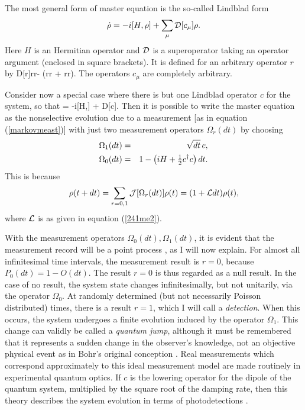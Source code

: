 \documentclass[12pt]{article}
\begin{document}
The most general form of master equation is the so-called Lindblad form
\cite{Lin76,Gar91}
\begin{equation} \label{241me1} 
\dot{\rho} = -{i}[H,\rho] + \sum_\mu  {\cal D}[c_\mu] \rho.
\end{equation}
Here $H$ is an Hermitian operator and ${\cal D}$ is a 
superoperator taking an operator argument (enclosed in square brackets). It is 
defined for an arbitrary operator $r$ by
\beq \label{defcalD}
{\cal D}[r]\rho \equiv r\rho r\dg -  (r\dg r \rho + \rho r\dg r).
\eeq
The operators $c_\mu$ are completely arbitrary. 

Consider now a special case where there is but one Lindblad operator $c$ for the
system, so that 
\beq \label{241me2}
\dot{\rho} = -i[H,\rho] + {\cal D}[c]\rho {}\rho.
\eeq
 Then it is possible to write the master
equation as the nonselective evolution due to a measurement [as in equation
(\ref{markovmeast})] with just two measurement operators $\Omega_r(dt)$ by choosing
\begin{eqnarray} \Omega_1(dt) &=& \sqrt{dt}\, c , \\
\Omega_0(dt) &= &1 - \left( {i}H + \mbox{$\frac{1}{2}$}c^\dagger c \right) dt.
\end{eqnarray}
This is because 
\begin{equation} \label{me2a}
\rho(t+dt) = \sum_{r=0,1} {\cal J}[\Omega_r(dt)] \rho(t) 
 = (1+{\cal L}dt)\rho(t),
\end{equation}
where ${\cal L}$ is as given in equation (\ref{241me2}). 

With the measurement operators $\Omega_0(dt),\Omega_1(dt)$, 
it is evident that the measurement record will be a point process \cite{CoxIsh80},
as I will now explain. For almost all infinitesimal time intervals, the  measurement
result is $r = 0$, because $P_0(dt) = 1 - O(dt)$. The result $r=0$ is thus
regarded as a  null result. In the case of no result, the system state changes
infinitesimally, but not unitarily, via the operator  $\Omega_0$. At randomly
determined (but not necessarily Poisson  distributed) times, there is a result $r =
1$, which I will call  a {\em detection}. When this occurs, the system undergoes a
finite  evolution induced by the operator $\Omega_1$. This change can validly be 
called a {\em quantum jump}, although it must be remembered that it  represents a
sudden change in the observer's knowledge, not an  objective physical event as in
Bohr's original conception  \cite{Boh13}. Real measurements 
which correspond approximately to this ideal measurement model are made routinely 
in experimental quantum 
optics. If $c$ is the lowering operator for the dipole of the quantum system,
multiplied by the  square root of the damping rate, then this theory describes 
the  system evolution in terms of photodetections \cite{Wis95b}. 
\end{document}
